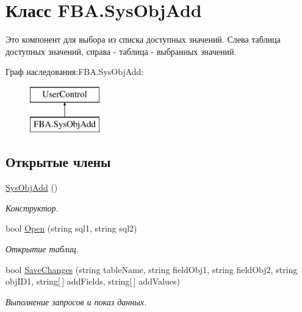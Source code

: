 \hypertarget{class_f_b_a_1_1_sys_obj_add}{}\section{Класс F\+B\+A.\+Sys\+Obj\+Add}
\label{class_f_b_a_1_1_sys_obj_add}


Это компонент для выбора из списка доступных значений. Слева таблица доступных значений, справа -\/ таблица -\/ выбранных значений.  


Граф наследования\+:F\+B\+A.\+Sys\+Obj\+Add\+:\begin{figure}[H]
\begin{center}
\leavevmode
\includegraphics[height=2.000000cm]{class_f_b_a_1_1_sys_obj_add}
\end{center}
\end{figure}
\subsection*{Открытые члены}
\begin{DoxyCompactItemize}
\item 
\mbox{\hyperlink{class_f_b_a_1_1_sys_obj_add_a58e9b73e70efa368559e0a5d37b418f0}{Sys\+Obj\+Add}} ()
\begin{DoxyCompactList}\small\item\em Конструктор. \end{DoxyCompactList}\item 
bool \mbox{\hyperlink{class_f_b_a_1_1_sys_obj_add_a3fd9081c2e6745d80ba5f090fb9fa60f}{Open}} (string sql1, string sql2)
\begin{DoxyCompactList}\small\item\em Открытие таблиц. \end{DoxyCompactList}\item 
bool \mbox{\hyperlink{class_f_b_a_1_1_sys_obj_add_a4d54648c900b7a222d288c86184e22c7}{Save\+Changes}} (string table\+Name, string field\+Obj1, string field\+Obj2, string obj\+I\+D1, string\mbox{[}$\,$\mbox{]} add\+Fields, string\mbox{[}$\,$\mbox{]} add\+Values)
\begin{DoxyCompactList}\small\item\em Выполнение запросов и показ данных. \end{DoxyCompactList}\end{DoxyCompactItemize}
